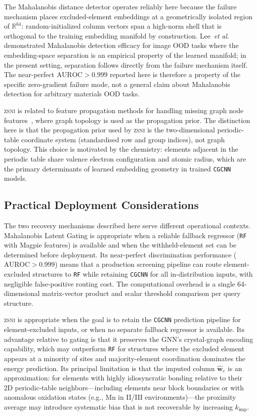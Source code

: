 \documentclass[final,5p,twocolumn,10pt]{elsarticle}
\newcommand{\auroc}{\text{AUROC}}
\newcommand{\cgcnn}{\texttt{CGCNN}}
\newcommand{\rf}{\texttt{RF}}
\newcommand{\zsni}{\textsc{zsni}}
\newcommand{\etal}{\textit{et al.}}
\begin{document}
The Mahalanobis distance detector operates reliably here because the failure
mechanism places excluded-element embeddings at a geometrically isolated
region of $\mathbb{R}^{64}$: random-initialized column vectors span a
high-norm shell that is orthogonal to the training embedding manifold
by construction. Lee~\etal{}~\cite{lee2018simple} demonstrated Mahalanobis
detection efficacy for image OOD tasks where the embedding-space separation
is an empirical property of the learned manifold; in the present setting,
separation follows directly from the failure mechanism itself. The near-perfect
$\auroc{} > 0.999$ reported here is therefore a property of the specific
zero-gradient failure mode, not a general claim about Mahalanobis detection
for arbitrary materials OOD tasks.

\zsni{} is related to feature propagation methods for handling missing graph
node features~\cite{rossi2021unreasonable}, where graph topology is used as
the propagation prior. The distinction here is that the propagation prior
used by \zsni{} is the two-dimensional periodic-table coordinate system
(standardised row and group indices), not graph topology. This choice is
motivated by the chemistry: elements adjacent in the periodic table share
valence electron configuration and atomic radius, which are the primary
determinants of learned embedding geometry in trained \cgcnn{} models.

\subsection{Practical Deployment Considerations}

The two recovery mechanisms described here serve different operational contexts.
Mahalanobis Latent Gating is appropriate when a reliable fallback regressor
(\rf{} with Magpie features) is available and when the withheld-element set
can be determined before deployment. Its near-perfect discrimination performance
($\auroc{} > 0.999$) means that a production screening pipeline can route
element-excluded structures to \rf{} while retaining \cgcnn{} for all
in-distribution inputs, with negligible false-positive routing cost.
The computational overhead is a single 64-dimensional matrix-vector product
and scalar threshold comparison per query structure.

\zsni{} is appropriate when the goal is to retain the \cgcnn{} prediction
pipeline for element-excluded inputs, or when no separate fallback regressor
is available. Its advantage relative to gating is that it preserves the GNN's
crystal-graph encoding capability, which may outperform \rf{} for structures
where the excluded element appears at a minority of sites and majority-element
coordination dominates the energy prediction. Its principal limitation is
that the imputed column $\hat{\bm{w}}_e$ is an approximation: for elements
with highly idiosyncratic bonding relative to their 2D periodic-table
neighbors---including elements near block boundaries or with anomalous
oxidation states (e.g., Mn in \textpm II/\textpm III environments)---the
proximity average may introduce systematic bias that is not recoverable
by increasing $k_{\text{imp}}$.
\end{document}
